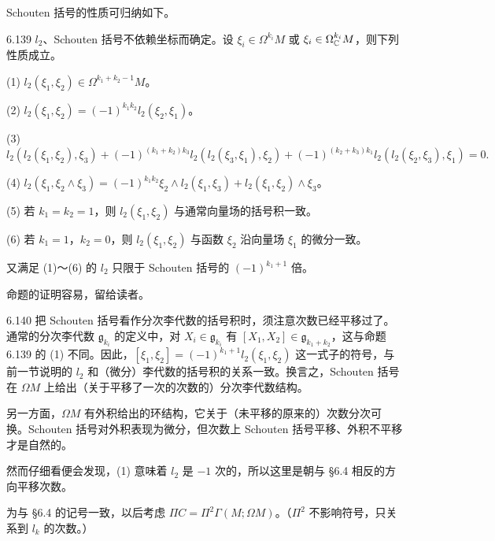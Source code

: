 
Schouten 括号的性质可归纳如下。

\begin{proposition}{6.139}
  $l_2$、Schouten 括号不依赖坐标而确定。设 $\xi_i\in\Omega^{k_i}M$ 或 $\xi_i\in\Omega^{k_i}_{\mathbb{C}}M$，则下列性质成立。

  (1) $l_2(\xi_1,\xi_2)\in\Omega^{k_1+k_2-1}M$。

  (2) $l_2(\xi_1,\xi_2)=(-1)^{k_1k_2}l_2(\xi_2,\xi_1)$。

  (3)
  \[
    l_2(l_2(\xi_1,\xi_2),\xi_3)+(-1)^{(k_1+k_2)k_3}l_2(l_2(\xi_3,\xi_1),\xi_2)
    +(-1)^{(k_2+k_3)k_1}l_2(l_2(\xi_2,\xi_3),\xi_1)=0.
  \]

  (4) $l_2(\xi_1,\xi_2\wedge\xi_3)=(-1)^{k_1k_2}\xi_2\wedge l_2(\xi_1,\xi_3)+l_2(\xi_1,\xi_2)\wedge\xi_3$。

  (5) 若 $k_1=k_2=1$，则 $l_2(\xi_1,\xi_2)$ 与通常向量场的括号积一致。

  (6) 若 $k_1=1$，$k_2=0$，则 $l_2(\xi_1,\xi_2)$ 与函数 $\xi_2$ 沿向量场 $\xi_1$ 的微分一致。

  又满足 (1)～(6) 的 $l_2$ 只限于 Schouten 括号的 $(-1)^{k_1+1}$ 倍。
\end{proposition}

命题的证明容易，留给读者。

\begin{remark}{6.140}
  把 Schouten 括号看作分次李代数的括号积时，须注意次数已经平移过了。通常的分次李代数 $\mathfrak{g}_{k_i}$ 的定义中，对 $X_i\in\mathfrak{g}_{k_i}$ 有 $[X_1,X_2]\in\mathfrak{g}_{k_1+k_2}$，这与命题 6.139 的 (1) 不同。因此，$[\xi_1,\xi_2]=(-1)^{k_1+1}l_2(\xi_1,\xi_2)$ 这一式子的符号，与前一节说明的 $l_2$ 和（微分）李代数的括号积的关系一致。换言之，Schouten 括号在 $\Omega M$ 上给出（关于平移了一次的次数的）分次李代数结构。

  另一方面，$\Omega M$ 有外积给出的环结构，它关于（未平移的原来的）次数分次可换。Schouten 括号对外积表现为微分，但次数上 Schouten 括号平移、外积不平移才是自然的。

  然而仔细看便会发现，(1) 意味着 $l_2$ 是 $-1$ 次的，所以这里是朝与 §6.4 相反的方向平移次数。

  为与 §6.4 的记号一致，以后考虑 $\Pi C=\Pi^2\Gamma(M;\Omega M)$。（$\Pi^2$ 不影响符号，只关系到 $l_k$ 的次数。）
\end{remark}

